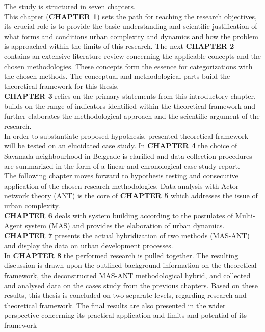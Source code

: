 \documentclass[11pt]{report}
\begin{document}
The study is structured in seven chapters.
\\
This chapter (\textbf{CHAPTER 1}) sets the path for reaching the research objectives, its crucial role is to provide the basic understanding and scientific justification of what forms and conditions urban complexity and dynamics and how the problem is approached within the limits of this research. The next \textbf{CHAPTER 2} contains an extensive literature review concerning the applicable concepts and the chosen methodologies. These concepts form the essence for categorizations with the chosen methods.
The conceptual and methodological parts build the theoretical framework for this thesis. 
\\
\textbf{CHAPTER 3} relies on the primary statements from this introductory chapter, builds on the range of indicators identified within the theoretical framework and further elaborates the methodological approach and the scientific argument of the research.
\\
In order to substantiate proposed hypothesis,  presented  theoretical framework will be tested on an elucidated case study. In \textbf{CHAPTER 4} the choice of Savamala neighbourhood in Belgrade is clarified and data collection procedures are summarized in the form of a linear and chronological case study report.
\\
The following chapter moves forward to hypothesis testing and consecutive application of the chosen research methodologies. Data analysis with Actor-network theory (ANT) is the core of \textbf{CHAPTER 5} which addresses the issue of urban complexity.
\\
\textbf{CHAPTER 6} deals with system building according to the postulates of Multi-Agent system (MAS) and provides the elaboration of urban dynamics.
\\
\textbf{CHAPTER 7} presents the actual hybridization of two methods (MAS-ANT) and display the data on urban development processes.
\\
In \textbf{CHAPTER 8} the performed research is pulled together. The resulting discussion is drawn upon the outlined background information on the theoretical framework, the deconstructed MAS-ANT methodological hybrid, and collected and analysed data on the cases study from the previous chapters. Based on these results, this thesis is concluded on two separate levels, regarding research and theoretical framework. The final results are also presented in the wider perspective concerning its practical application and limits and potential of its framework
\end{document}
